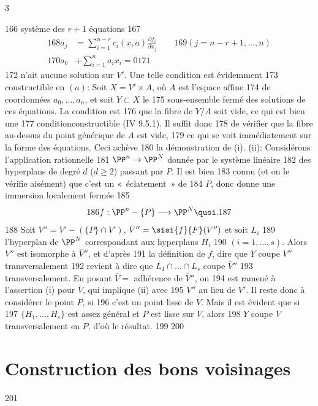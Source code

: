 3	\documentclass[10pt]{../fichiers-configuration-latex/smfart}
\begin{document}
   166	système des $r+1$ équations
   167	\begin{align*}
   168	a_j &= \sum^{n-r}_{i=1} c_i (x,a)\frac{\partial f_i}{\partial x_j}\qquad
   169	(j=n-r+1,\ldots, n)\\
   170	a_0 &+ \sum^n_{i=1} a_i x_i =0
   171	\end{align*}
   172	n'ait aucune solution sur $V'$. Une telle condition est évidemment
   173	constructible en $(a)$: Soit $X=V'\times A$, où $A$ est l'espace affine
   174	de coordonnées $a_0,\ldots,a_n$, et soit $Y\subset X$ le
   175	sous-ensemble fermé des solutions de ces équations. La condition est
   176	que la fibre de $Y/A$ soit vide, ce qui est bien une
   177	condition\pageoriginale constructible (\EGA IV 9.5.1). Il suffit donc %
   178	de vérifier que la fibre au-dessus du point générique de $A$ est vide,
   179	ce qui se voit immédiatement sur la forme des équations. Ceci achève
   180	la démonstration de (i). (ii): Considérons l'application rationnelle
   181	$\PP^n\rightarrow \PP^N$ donnée par le système linéaire
   182	des hyperplans de degré $d$ ($d\geq 2$) passant par $P$. Il est bien
   183	connu (et on le vérifie aisément) que c'est un « éclatement » de
   184	$P$, donc donne une immersion localement fermée
   185	$$
   186	f:\PP^n-\{P\}\longrightarrow \PP^N{\quoi}.
   187	$$
   188	Soit $V''=V'-(\{P\}\cap V')$, $\bar{V}{}''=\sisi{f}{F}(V'')$ et soit $L_i$
   189	l'hyperplan de $\PP^N$ correspondant aux hyperplans $H_i$
   190	$(i=1,\ldots,s)$. Alors $V''$ est isomorphe à $\bar{V}{}''$, et d'après
   191	la définition de $f$, dire que $Y$ coupe $V''$ transversalement
   192	revient à dire que $L_1\cap\ldots \cap L_s$ coupe $\bar{V}{}''$
   193	transversalement. En posant $\bar{V}=$ adhérence de $\bar{V}{}''$, on
   194	est ramené à l'assertion (i) pour $\bar{V}$, qui implique (ii) avec
   195	$V''$ au lieu de $V'$. Il reste donc à considérer le point $P$, si
   196	c'est un point lisse de $V$. Mais il est évident que si
   197	$\{H_1,\ldots,H_s\}$ est assez général et $P$ est lisse sur $V$, alors
   198	$Y$ coupe $V$ transversalement en $P$, d'où le résultat.
   199	
   200	\section{Construction des bons voisinages}
   201	
\end{document}
